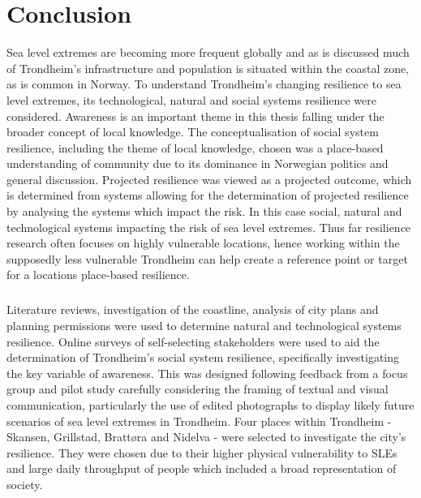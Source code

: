 


\chapter{Conclusion}

Sea level extremes are becoming more frequent globally and as is discussed much of Trondheim's infrastructure and population is situated within the coastal zone, as is common in Norway. To understand Trondheim's changing resilience to sea level extremes, its technological, natural and social systems resilience were considered. Awareness is an important theme in this thesis falling under the broader concept of local knowledge. The conceptualisation of social system resilience, including the theme of local knowledge, chosen was a place-based understanding of community due to its dominance in Norwegian politics and general discussion. Projected resilience was viewed as a projected outcome, which is determined from systems allowing for the determination of projected resilience by analysing the systems which impact the risk. In this case social, natural and technological systems impacting the risk of sea level extremes. Thus far resilience research often focuses on highly vulnerable locations, hence working within the supposedly less vulnerable Trondheim can help create a reference point or target for a locations place-based resilience.
\paragraph{}

Literature reviews, investigation of the coastline, analysis of city plans and planning permissions were used to determine natural and technological systems resilience. Online surveys of self-selecting stakeholders were used to aid the determination of Trondheim's social system resilience, specifically investigating the key variable of awareness. This was designed following feedback from a focus group and pilot study carefully considering the framing of textual and visual communication, particularly the use of edited photographs to display likely future scenarios of sea level extremes in Trondheim.  Four places within Trondheim - Skansen, Grillstad, Brattøra and Nidelva - were selected to investigate the city's resilience. They were chosen due to their higher physical vulnerability to SLEs and large daily throughput of people which included a broad representation of society.
